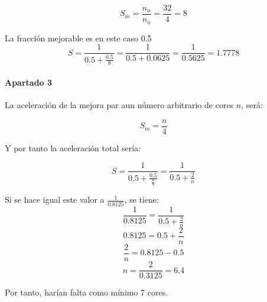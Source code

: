 \[
S_m = \frac{n_n}{n_a} = \frac{32}{4} = 8
\]

La fracción mejorable es en este caso 0.5
\[
S = \frac{1}{0.5 + \frac{0.5}{8}} = \frac{1}{0.5 + 0.0625} = \frac{1}{0.5625} = 1.7778
\]

\paragraph{Apartado 3}
La aceleración de la mejora par aun número arbitrario de cores $n$, será:

\[
S_m = \frac{n}{4}
\]

Y por tanto la aceleración total sería:

\[
S = \frac{1}{0.5 + 
\frac{0.5}{\frac{n}{4}}} = 
\frac{1}{0.5 + \frac{2}{n}}
\]

Si se hace igual este valor a $\frac{1}{0.8125}$, se tiene:
\[
\frac{1}{0.8125} = \frac{1}{0.5+\frac{2}{n}}
\]
\[ 0.8125 = 0.5 + \frac{2}{n} \]
\[ \frac{2}{n} = 0.8125 - 0.5 \]
\[ n = \frac{2}{0.3125} = 6.4 \]

Por tanto, harían falta como mínimo 7 cores.


